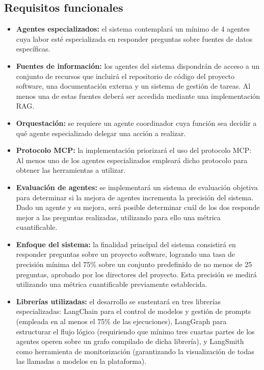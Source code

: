 \subsection{Requisitos funcionales}
\begin{itemize}
\item\textbf{Agentes especializados: }el sistema contemplará un mínimo de 4 agentes cuya labor esté especializada en responder preguntas sobre fuentes de datos específicas.
\item\textbf{Fuentes de información: }los agentes del sistema dispondrán de acceso a un conjunto de recursos que incluirá el repositorio de código del proyecto software, una documentación externa y un sistema de gestión de tareas. Al menos una de estas fuentes deberá ser accedida mediante una implementación RAG.
\item\textbf{Orquestación: }se requiere un agente coordinador cuya función sea decidir a qué agente especializado delegar una acción a realizar.
\item\textbf{Protocolo MCP: }la implementación priorizará el uso del protocolo MCP: Al menos uno de los agentes especializados empleará dicho protocolo para obtener las herramientas a utilizar.
\item\textbf{Evaluación de agentes: }se implementará un sistema de evaluación objetiva para determinar si la mejora de agentes incrementa la precisión del sistema. Dado un agente y su mejora, será posible determinar cuál de los dos responde mejor a las preguntas realizadas, utilizando para ello una métrica cuantificable. 
\item\textbf{Enfoque del sistema: }la finalidad principal del sistema consistirá en responder preguntas sobre un proyecto software, logrando una tasa de precisión mínima del 75\% sobre un conjunto predefinido de no menos de 25 preguntas, aprobado por los directores del proyecto. Esta precisión se medirá utilizando una métrica cuantificable previamente establecida.
\item\textbf{Librerías utilizadas: }el desarrollo se sustentará en tres librerías especializadas: LangChain para el control de modelos y gestión de prompts (empleada en al menos el 75\% de las ejecuciones), LangGraph para estructurar el flujo lógico (requiriendo que mínimo tres cuartas partes de los agentes operen sobre un grafo compilado de dicha librería), y LangSmith como herramienta de monitorización (garantizando la visualización de todas las llamadas a modelos en la plataforma).
\end{itemize}


